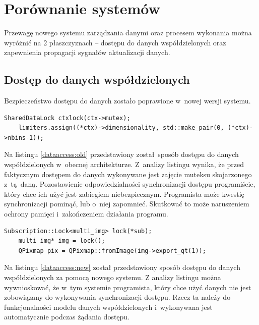 \section{Porównanie systemów}
Przewagę nowego systemu zarządzania danymi oraz procesem wykonania można wyróżnić na 2 płaszczyznach -- dostępu do danych współdzielonych oraz zapewnienia propagacji sygnałów aktualizacji danych.

\subsection{Dostęp do danych współdzielonych}

Bezpieczeństwo dostępu do danych zostało poprawione w~nowej wersji systemu.


\begin{minipage}{\textwidth}
	\begin{lstlisting}[label=dataaccess:old, caption={Przykład dostępu do danych według bieżącego systemu.},alsoletter={()[].=}]
	SharedDataLock ctxlock(ctx->mutex);
	limiters.assign((*ctx)->dimensionality, std::make_pair(0, (*ctx)->nbins-1));
	\end{lstlisting}
\end{minipage}

Na listingu \ref{dataaccess:old} przedstawiony został sposób dostępu do danych współdzielonych w~obecnej architekturze. Z~analizy listingu wynika, że przed faktycznym dostępem do danych wykonywane jest zajęcie muteksu skojarzonego z~tą daną. Pozostawienie odpowiedzialności synchronizacji dostępu programiście, który chce ich użyć jest zabiegiem niebezpiecznym. Programista może kwestię synchronizacji pominąć, lub o~niej zapomnieć. Skutkować to może naruszeniem ochrony pamięci i~zakończeniem działania programu.

\begin{minipage}{\textwidth}
	\begin{lstlisting}[label=dataaccess:new, caption={Przykład dostępu do danych według nowego systemu.},alsoletter={()[].=}]
	Subscription::Lock<multi_img> lock(*sub);
	multi_img* img = lock();
	QPixmap pix = QPixmap::fromImage(img->export_qt(1));
	\end{lstlisting}
\end{minipage}

Na listingu \ref{dataaccess:new} został przedstawiony sposób dostępu do danych współdzielonych za pomocą nowego systemu. Z analizy listingu można wywnioskować, że w~tym systemie programista, który chce użyć danych nie jest zobowiązany do wykonywania synchronizacji dostępu. Rzecz ta należy do funkcjonalności modelu danych współdzielonych i~wykonywana jest automatycznie podczas żądania dostępu.

